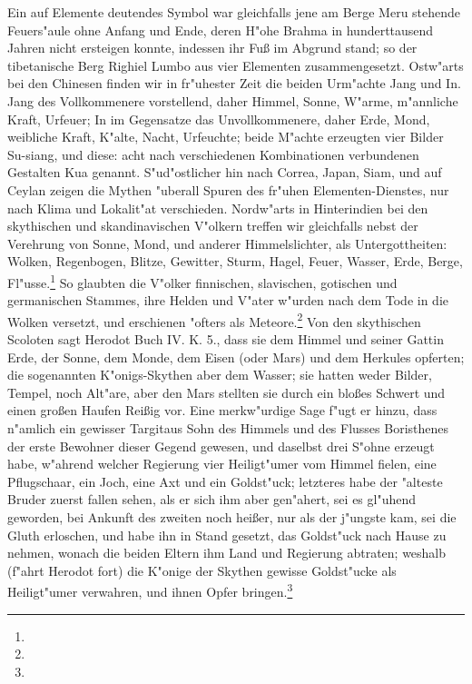 \documentclass[a4paper, 11pt, oneside, polutonikogreek, german]{article}
\begin{document}
Ein auf Elemente deutendes Symbol war gleichfalls jene am Berge Meru stehende Feuers"aule ohne Anfang und Ende, deren H"ohe Brahma in hunderttausend Jahren nicht ersteigen konnte, indessen ihr Fuß im Abgrund stand; so der tibetanische Berg Righiel Lumbo aus vier Elementen zusammengesetzt. Ostw"arts bei den Chinesen finden wir in fr"uhester Zeit die beiden Urm"achte Jang und In. Jang des Vollkommenere vorstellend, daher Himmel, Sonne, W"arme, m"annliche Kraft, Urfeuer; In im Gegensatze das Unvollkommenere, daher Erde, Mond, weibliche Kraft, K"alte, Nacht, Urfeuchte; beide M"achte erzeugten vier Bilder Su-siang, und diese: acht nach verschiedenen Kombinationen verbundenen Gestalten Kua genannt. S"ud"ostlicher hin nach Correa, Japan, Siam, und auf Ceylan zeigen die Mythen "uberall Spuren des fr"uhen Elementen-Dienstes, nur nach Klima und Lokalit"at verschieden. Nordw"arts in Hinterindien bei den skythischen und skandinavischen V"olkern treffen wir gleichfalls nebst der Verehrung von Sonne, Mond, und anderer Himmelslichter, als Untergottheiten: Wolken, Regenbogen, Blitze, Gewitter, Sturm, Hagel, Feuer, Wasser, Erde, Berge, Fl"usse.\footnote{} So glaubten die V"olker finnischen, slavischen, gotischen und germanischen Stammes, ihre Helden und V"ater w"urden nach dem Tode in die Wolken versetzt, und erschienen "ofters als Meteore.\footnote{} Von den skythischen Scoloten sagt Herodot Buch IV. K. 5., dass sie dem Himmel und seiner Gattin Erde, der Sonne, dem Monde, dem Eisen (oder Mars) und dem Herkules opferten; die sogenannten K"onigs-Skythen aber dem Wasser; sie hatten weder Bilder, Tempel, noch Alt"are, aber den Mars stellten sie durch ein bloßes Schwert und einen großen Haufen Reißig vor. Eine merkw"urdige Sage f"ugt er hinzu, dass n"amlich ein gewisser Targitaus Sohn des Himmels und des Flusses Boristhenes der erste Bewohner dieser Gegend gewesen, und daselbst drei S"ohne erzeugt habe, w"ahrend welcher Regierung vier Heiligt"umer vom Himmel fielen, eine Pflugschaar, ein Joch, eine Axt und ein Goldst"uck; letzteres habe der "alteste Bruder zuerst fallen sehen, als er sich ihm aber gen"ahert, sei es gl"uhend geworden, bei Ankunft des zweiten noch heißer, nur als der j"ungste kam, sei die Gluth erloschen, und habe ihn in Stand gesetzt, das Goldst"uck nach Hause zu nehmen, wonach die beiden Eltern ihm Land und Regierung abtraten; weshalb (f"ahrt Herodot fort) die K"onige der Skythen gewisse Goldst"ucke als Heiligt"umer verwahren, und ihnen Opfer bringen.\footnote{}
\end{document}
